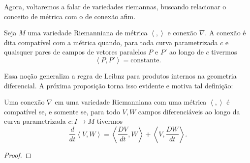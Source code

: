 Agora, voltaremos a falar de variedades riemannas, buscando relacionar o conceito de métrica com o de conexão afim.
\begin{definition}
    \label{loc:3.1_:_def_4_:_conexão_compatível}
    Seja $M$ uma variedade Riemanniana de métrica $\left<,\right>$ e conexão $\nabla$.
    A conexão é dita compatível com a métrica quando, para toda curva parametrizada $c$ e quaisquer pares de campos de vetores paralelos $P$ e $P'$ ao longo de $c$ tivermos
    \begin{equation*}
        \left<P,P'\right> = \text{constante}.
    \end{equation*}
\end{definition}
Essa noção generaliza a regra de Leibnz para produtos internos na geometria diferencial. A próxima proposição torna isso evidente e motiva tal definição:
\begin{proposition}
    \label{loc:3.2_:_prop_3_:_leibniz_para_conexão_compatível}
    Uma conexão $\nabla$ em uma variedade Riemanniana com uma métrica $\left<,\right>$ é compatível se, e somente se, para todo $V,W$ campos diferenciáveis ao longo da curva parametrizada $c:I\to M$ tivermos
    \begin{equation*}
        \frac{d}{dt}\left<V,W\right> =\left<\frac{DV}{dt},W\right> +\left<V,\frac{DW}{dt}\right>. \tag{*}
    \end{equation*}
    \begin{proof}


\end{proof}
\end{proposition}
